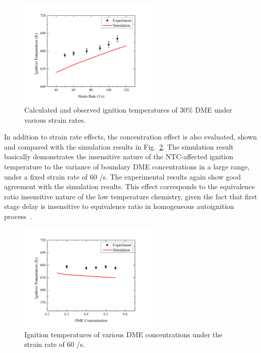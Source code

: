 \documentclass[review,3p,times]{elsarticleUS}
\begin{document}
\begin{figure}[ht]
  \centering
  \scriptsize
  \vspace{-0.1in}
  \includegraphics[width=0.6\textwidth]{Ign-SR.png}
  \normalsize
  \vspace{-0.1in}
  \caption{Calculated and observed ignition temperatures of $30\%$ DME under various strain rates.}
  \label{fig:Ign-SR}
\end{figure} 

In addition to strain rate effects, the concentration effect is also evaluated, shown and compared with the simulation results in Fig.~\ref{fig:Ign-Con}. The simulation result basically demonstrates the insensitive nature of the NTC-affected ignition temperature to the variance of boundary DME concentrations in a large range, under a fixed strain rate of $60$ /s. The experimental results again show good agreement with the simulation results. This effect corresponds to the equivalence ratio insensitive nature of the low temperature chemistry, given the fact that first stage delay is insensitive to equivalence ratio in homogeneous autoignition process~\cite{zhao13}.

\begin{figure}[ht]
  \centering
  \scriptsize
  \vspace{-0.1in}
  \includegraphics[width=0.6\textwidth]{Ign-Con.png}
  \normalsize
  \vspace{-0.1in}
  \caption{Ignition temperatures of various DME concentrations under the strain rate of $60$ /s.}
  \label{fig:Ign-Con}
\end{figure}
\end{document}
